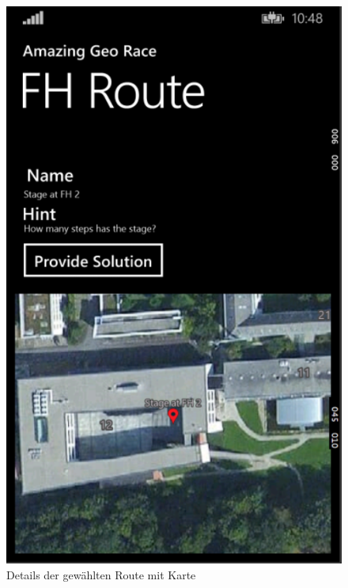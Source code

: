 \documentclass[a4paper,ngerman]{scrartcl}
\begin{document}
\begin{figure}[h]
\centering
\includegraphics[width=.95\textwidth]{images/routeDetailsPage}
\caption{Details der gewählten Route mit Karte}
\end{figure}
\end{document}
